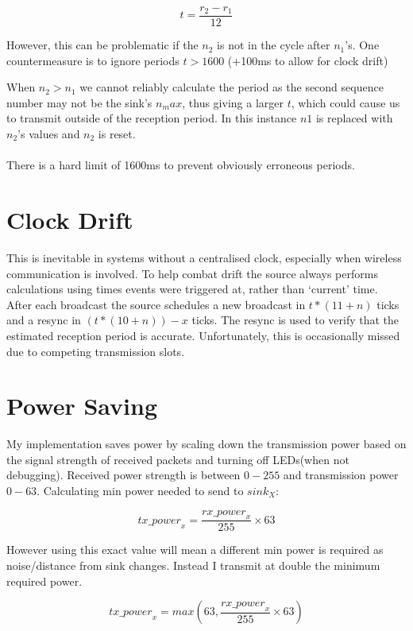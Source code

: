 \documentclass{article}
\begin{document}
$$t = \frac{r_2 -r_1} {12}$$

However, this can be problematic if the $n_2$ is not in the cycle after $n_1$'s. One countermeasure is to ignore
periods $t > 1600$ (+100ms to allow for clock drift)


When $n_2 > n_1$ we cannot reliably calculate the period as the second
sequence number may not be the sink's $n_max$, thus giving a larger $t$, which could cause us to transmit outside
of the reception period. In this instance $n1$ is replaced with $n_2$'s values and $n_2$ is reset.

\paragraph{}
There is a hard limit of 1600ms to prevent obviously erroneous periods.

\section{Clock Drift}

This is inevitable in systems without a centralised clock, especially when wireless communication is involved.
To help combat drift the source always performs calculations using times events were triggered at, rather than 
`current' time. After each broadcast the source schedules a new broadcast in $t * (11 + n)$ ticks and a resync in 
$(t * (10 + n)) - x$ ticks. The resync is used to verify that the estimated reception period is accurate.
Unfortunately, this is occasionally missed due to competing transmission slots.

\section{Power Saving}

My implementation saves power by scaling down the transmission power based on the signal strength of received packets and turning
off LEDs(when not debugging).
Received power strength is between $0-255$ and transmission power $0-63$. Calculating min power needed to send to $sink_X$:

$$
\mathit{tx\_power}_x = \frac{\mathit{rx\_power}_x} {255} \times 63
$$

However using this exact value will mean a different min power is required as noise/distance from sink changes. 
Instead I transmit at double the minimum required power.

$$
\mathit{tx\_power}_x = max(63, \frac{\mathit{rx\_power}_x} {255} \times 63)
$$
\end{document}
